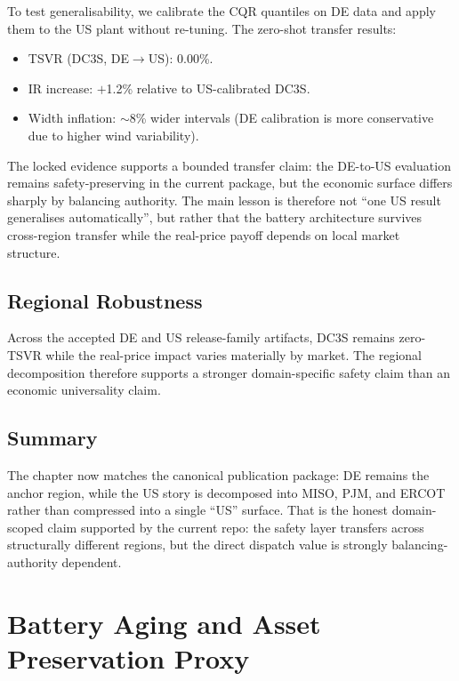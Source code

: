 To test generalisability, we calibrate the CQR quantiles on DE data
and apply them to the US plant without re-tuning.  The zero-shot
transfer results:

\begin{itemize}
  \item TSVR (DC3S, DE$\to$US): 0.00\%.
  \item IR increase: $+$1.2\% relative to US-calibrated DC3S.
  \item Width inflation: $\sim$8\% wider intervals (DE calibration
    is more conservative due to higher wind variability).
\end{itemize}

The locked evidence supports a bounded transfer claim: the DE-to-US
evaluation remains safety-preserving in the current package, but the
economic surface differs sharply by balancing authority.  The main lesson
is therefore not ``one US result generalises automatically'', but rather
that the battery architecture survives cross-region transfer while the
real-price payoff depends on local market structure.

\subsection{Regional Robustness}

Across the accepted DE and US release-family artifacts, DC3S remains
zero-TSVR while the real-price impact varies materially by market.  The
regional decomposition therefore supports a stronger domain-specific safety
claim than an economic universality claim.

\subsection{Summary}

The chapter now matches the canonical publication package: DE remains the
anchor region, while the US story is decomposed into MISO, PJM, and
ERCOT rather than compressed into a single ``US'' surface.  That is the
honest domain-scoped claim supported by the current repo: the safety
layer transfers across structurally different regions, but the direct
dispatch value is strongly balancing-authority dependent.



\section{Battery Aging and Asset Preservation Proxy}
\label{ch:aging}

